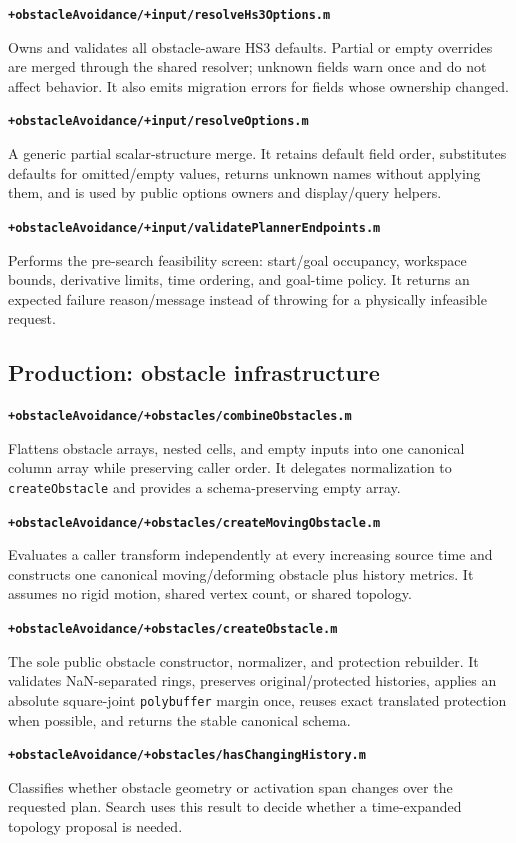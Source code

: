 \documentclass[10pt,letterpaper]{article}
\newcommand{\file}[1]{\nolinkurl{#1}}
\newcommand{\scriptentry}[2]{%
  \par\medskip\noindent\textbf{\file{#1}}\par
  \begingroup\raggedright #2\par\endgroup
}
\begin{document}
\scriptentry{+obstacleAvoidance/+input/resolveHs3Options.m}{Owns and validates
all obstacle-aware HS3 defaults. Partial or empty overrides are merged through
the shared resolver; unknown fields warn once and do not affect behavior. It
also emits migration errors for fields whose ownership changed.}

\scriptentry{+obstacleAvoidance/+input/resolveOptions.m}{A generic partial
scalar-structure merge. It retains default field order, substitutes defaults
for omitted/empty values, returns unknown names without applying them, and is
used by public options owners and display/query helpers.}

\scriptentry{+obstacleAvoidance/+input/validatePlannerEndpoints.m}{Performs the
pre-search feasibility screen: start/goal occupancy, workspace bounds,
derivative limits, time ordering, and goal-time policy. It returns an expected
failure reason/message instead of throwing for a physically infeasible request.}

\subsection{Production: obstacle infrastructure}

\scriptentry{+obstacleAvoidance/+obstacles/combineObstacles.m}{Flattens obstacle
arrays, nested cells, and empty inputs into one canonical column array while
preserving caller order. It delegates normalization to \file{createObstacle}
and provides a schema-preserving empty array.}

\scriptentry{+obstacleAvoidance/+obstacles/createMovingObstacle.m}{Evaluates a
caller transform independently at every increasing source time and constructs
one canonical moving/deforming obstacle plus history metrics. It assumes no
rigid motion, shared vertex count, or shared topology.}

\scriptentry{+obstacleAvoidance/+obstacles/createObstacle.m}{The sole public
obstacle constructor, normalizer, and protection rebuilder. It validates
NaN-separated rings, preserves original/protected histories, applies an
absolute square-joint \file{polybuffer} margin once, reuses exact translated
protection when possible, and returns the stable canonical schema.}

\scriptentry{+obstacleAvoidance/+obstacles/hasChangingHistory.m}{Classifies
whether obstacle geometry or activation span changes over the requested plan.
Search uses this result to decide whether a time-expanded topology proposal is
needed.}
\end{document}
